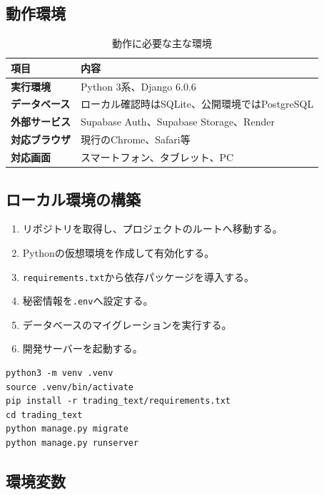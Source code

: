 \documentclass[11pt,a4paper]{article}
\begin{document}
\subsection{動作環境}

\begin{table}[H]
  \centering
  \caption{動作に必要な主な環境}
  \begin{tabularx}{\textwidth}{>{\bfseries}p{}X}
    \toprule
    項目 & 内容\\
    \midrule
    実行環境 & Python 3系、Django 6.0.6\\
    データベース & ローカル確認時はSQLite、公開環境ではPostgreSQL\\
    外部サービス & Supabase Auth、Supabase Storage、Render\\
    対応ブラウザ & 現行のChrome、Safari等\\
    対応画面 & スマートフォン、タブレット、PC\\
    \bottomrule
  \end{tabularx}
\end{table}

\subsection{ローカル環境の構築}

\begin{enumerate}
  \item リポジトリを取得し、プロジェクトのルートへ移動する。
  \item Pythonの仮想環境を作成して有効化する。
  \item \texttt{requirements.txt}から依存パッケージを導入する。
  \item 秘密情報を\texttt{.env}へ設定する。
  \item データベースのマイグレーションを実行する。
  \item 開発サーバーを起動する。
\end{enumerate}

\begin{verbatim}
python3 -m venv .venv
source .venv/bin/activate
pip install -r trading_text/requirements.txt
cd trading_text
python manage.py migrate
python manage.py runserver
\end{verbatim}

\subsection{環境変数}
\end{document}
